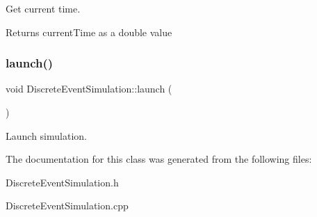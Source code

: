 Get current time. \begin{DoxyReturn}{Returns}
current\+Time as a double value 
\end{DoxyReturn}
\mbox{\label{classDiscreteEventSimulation_aae616e227950798dc958171210975713}} 
\subsubsection{\texorpdfstring{launch()}{launch()}}
{\footnotesize\ttfamily void Discrete\+Event\+Simulation\+::launch (\begin{DoxyParamCaption}{ }\end{DoxyParamCaption})}

Launch simulation. 

The documentation for this class was generated from the following files\+:\begin{DoxyCompactItemize}
\item 
Discrete\+Event\+Simulation.\+h\item 
Discrete\+Event\+Simulation.\+cpp\end{DoxyCompactItemize}
